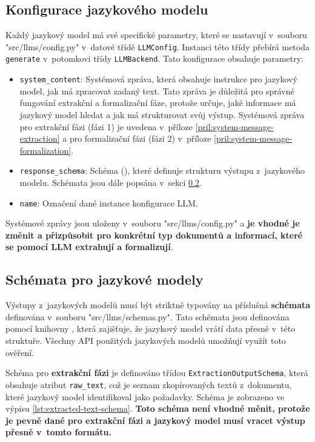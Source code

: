 \documentclass[czech, bc, kiv, he, iso690numb, pdf]{fasthesis}
\begin{document}
\subsection{Konfigurace jazykového modelu}
Každý jazykový model má své specifické parametry, které se nastavují v~souboru \filename"src/llms/config.py" v~datové třídě \verb"LLMConfig". Instanci této třídy přebírá metoda \verb"generate" v~potomkovi třídy \verb"LLMBackend". Tato konfigurace obsahuje parametry:
\begin{itemize}
    \item \verb"system_content": Systémová zpráva, která obsahuje instrukce pro jazykový model, jak má zpracovat zadaný text. Tato zpráva je důležitá pro správné fungování extrakční a formalizační fáze, protože určuje, jaké informace má jazykový model hledat a jak má strukturovat svůj výstup. Systémová zpráva pro extrakční fázi (fázi 1) je uvedena v~příloze \ref{pril:system-message-extraction} a pro formalizační fázi (fázi 2) v~příloze \ref{pril:system-message-formalization}.
    \item \verb"response_schema": Schéma (), které definuje strukturu výstupu z~jazykového modelu. Schémata jsou dále popsána v~sekci \ref{sec:llm-schemas}.
    \item \verb"name": Označení dané instance konfigurace LLM.
\end{itemize}

Systémové zprávy jsou uloženy v~souboru \filename"src/llms/config.py" a \textbf{je vhodné je změnit a přizpůsobit pro konkrétní typ dokumentů a informací, které se pomocí LLM extrahují a formalizují}.

\subsection{Schémata pro jazykové modely}\label{sec:llm-schemas}
Výstupy z~jazykových modelů musí být striktně typovány na příslušná \textbf{schémata} definována v~souboru \filename"src/llms/schemas.py". Tato schémata jsou definována pomocí knihovny , která zajišťuje, že jazykový model vrátí data přesně v~této struktuře. Všechny API použitých jazykových modelů umožňují využít toto ověření.

Schéma pro \textbf{extrakční fázi} je definováno třídou \verb"ExtractionOutputSchema", která obsahuje atribut \verb"raw_text", což je seznam zkopírovaných textů z~dokumentu, které jazykový model identifikoval jako požadavky. Schéma je zobrazeno ve výpisu \ref{lst:extracted-text-schema}. \textbf{Toto schéma není vhodné měnit, protože je pevně dané pro extrakční fázi a jazykový model musí vracet výstup přesně v~tomto formátu.}
\end{document}
